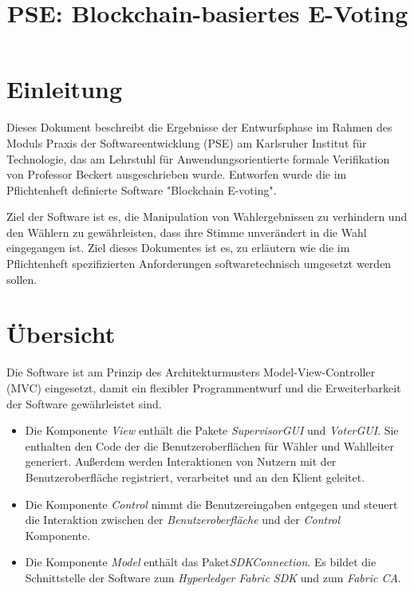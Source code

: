 \documentclass[parskip=full]{scrartcl}
\title{PSE: Blockchain-basiertes E-Voting}
\begin{document}
	\clearpage
	\maketitle
	\newpage
	
	\tableofcontents
	\newpage
	\section{Einleitung}
	
	Dieses Dokument beschreibt die Ergebnisse der Entwurfsphase im Rahmen des Moduls Praxis der Softwareentwicklung (PSE) am Karlsruher Institut für Technologie, das am Lehrstuhl für Anwendungsorientierte formale Verifikation von Professor Beckert ausgeschrieben wurde.
	Entworfen wurde die im Pflichtenheft definierte Software "Blockchain E-voting". 
	
	Ziel der Software ist es, die Manipulation
	von Wahlergebnissen zu verhindern und den Wählern zu gewährleisten, dass ihre Stimme unverändert in die Wahl eingegangen ist.
	Ziel dieses Dokumentes ist es, zu erläutern wie die im Pflichtenheft spezifizierten Anforderungen softwaretechnisch umgesetzt werden sollen.
	
	\section{Übersicht}
	\label{Übersicht}
	
	Die Software ist am Prinzip des Architekturmusters Model-View-Controller (MVC) eingesetzt, damit ein flexibler Programmentwurf und die Erweiterbarkeit der Software gewährleistet sind.
	
	\begin{itemize}
		\item Die Komponente \textit{View} enthält die Pakete \textit{SupervisorGUI} und \textit{VoterGUI}. Sie enthalten den Code der die Benutzeroberflächen für Wähler und Wahlleiter generiert. Außerdem werden Interaktionen von Nutzern mit der Benutzeroberfläche registriert, verarbeitet und an den Klient geleitet.
		\item Die Komponente \textit{Control} nimmt die Benutzereingaben entgegen und steuert die Interaktion zwischen der \textit{Benutzeroberfläche} und der \textit{Control} Komponente.
		\item Die Komponente \textit{Model} enthält das Paket\textit{SDKConnection}. Es bildet die Schnittstelle der Software zum \textit{Hyperledger Fabric SDK} und zum \textit{Fabric CA}.
	\end{itemize}
	
\end{document}
